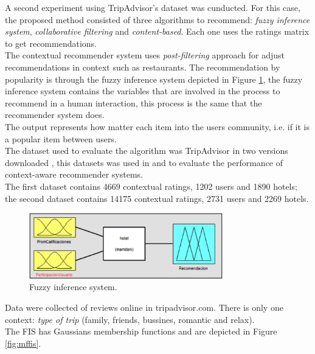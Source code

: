 A second experiment using TripAdvisor's dataset was cunducted.  For
this case, the proposed method consisted of three algorithms  to
recommend:  \textit{fuzzy inference system}, \textit{collaborative
filtering} and \textit{content-based}. Each one uses the ratings
matrix to get recommendations.\\     The contextual recommender system
uses  \textit{post-filtering} approach  \cite{adomavicius2011context}
for adjust recommendations in context such as restaurants. 
The recommendation by popularity is  through the fuzzy inference system
depicted in Figure  \ref{fig:fis},  the fuzzy inference system
contains the variables that are involved in the process to recommend
in a human interaction, this process is the same that the recommender
system does. \\The output represents how matter each item into the
users community, i.e. if it is a popular item between users. \\ The
dataset used to evaluate the algorithm was TripAdvisor in two versions
downloaded  \cite{linkzeng}, this datasets was used in
\cite{zheng2014context} and  \cite{zheng2012differential} to  evaluate
the performance of context-aware recommender systems. \\The first
dataset contains 4669 contextual ratings, 1202 users and 1890 hotels;
the second dataset contains 14175 contextual ratings, 2731 users and
2269 hotels. 
\begin{figure}
\captionsetup{justification=centering,margin=2cm,font=footnotesize}
\centering
\setlength\fboxsep{0pt}
\setlength\fboxrule{0.7pt}
\includegraphics[width=0.75\textwidth]{img/fis.png}
\caption{Fuzzy inference system.}
\label{fig:fis}   
\end{figure}
Data were collected of reviews online in tripadvisor.com.
There is only one context: \textit{type of trip} (family, friends,
bussines, romantic and relax).\\  The FIS has Gaussians membership
functions and are depicted in  Figure  \ref{fig:mffis}.
